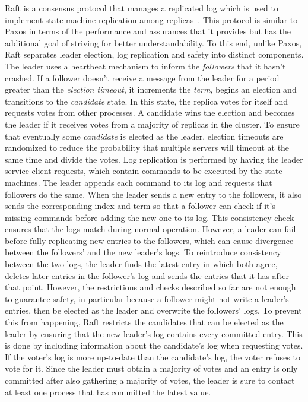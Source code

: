 Raft is a consensus protocol that manages a replicated log which is used to implement state machine replication among replicas~\cite{184040}. This protocol is similar to Paxos in terms of the performance and assurances that it provides but has the additional goal of striving for better understandability. To this end, unlike Paxos, Raft separates leader election, log replication and safety into distinct components. The leader uses a heartbeat mechanism to inform the \textit{followers} that it hasn't crashed. If a follower doesn't receive a message from the leader for a period greater than the \textit{election timeout}, it increments the \textit{term}, begins an election and transitions to the \textit{candidate} state. In this state, the replica votes for itself and requests votes from other processes. A candidate wins the election and becomes the leader if it receives votes from a majority of replicas in the cluster. To ensure that eventually some \textit{candidate} is elected as the leader, election timeouts are randomized to reduce the probability that multiple servers will timeout at the same time and divide the votes. Log replication is performed by having the leader service client requests, which contain commands to be executed by the state machines. The leader appends each command to its log and requests that followers do the same. When the leader sends a new entry to the followers, it also sends the corresponding index and term so that a follower can check if it's missing commands before adding the new one to its log. This consistency check ensures that the logs match during normal operation. However, a leader can fail before fully replicating new entries to the followers, which can cause divergence between the followers' and the new leader's logs. To reintroduce consistency between the two logs, the leader finds the latest entry in which both agree, deletes later entries in the follower's log and sends the entries that it has after that point. However, the restrictions and checks described so far are not enough to guarantee safety, in particular because a follower might not write a leader's entries, then be elected as the leader and overwrite the followers' logs. To prevent this from happening, Raft restricts the candidates that can be elected as the leader by ensuring that the new leader's log contains every committed entry. This is done by including information about the candidate's log when requesting votes. If the voter's log is more up-to-date than the candidate's log, the voter refuses to vote for it. Since the leader must obtain a majority of votes and an entry is only committed after also gathering a majority of votes, the leader is sure to contact at least one process that has committed the latest value. \par
